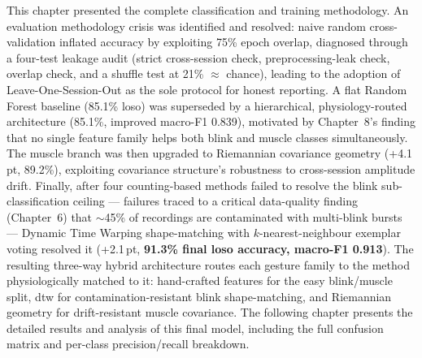 This chapter presented the complete classification and training
methodology. An evaluation methodology crisis was identified and
resolved: naive random cross-validation inflated accuracy by
exploiting 75\% epoch overlap, diagnosed through a four-test
leakage audit (strict cross-session check, preprocessing-leak
check, overlap check, and a shuffle test at 21\% $\approx$ chance),
leading to the adoption of Leave-One-Session-Out as the sole
protocol for honest reporting. A flat Random Forest baseline
(85.1\% \acrshort{loso}) was superseded by a hierarchical,
physiology-routed architecture (85.1\%, improved macro-F1 0.839),
motivated by Chapter~8's finding that no single feature family
helps both blink and muscle classes simultaneously. The muscle
branch was then upgraded to Riemannian covariance geometry
(+4.1\,pt, 89.2\%), exploiting covariance structure's robustness
to cross-session amplitude drift. Finally, after four
counting-based methods failed to resolve the blink sub-classification
ceiling --- failures traced to a critical data-quality finding
(Chapter~6) that $\sim$45\% of  recordings are
contaminated with multi-blink bursts --- Dynamic Time Warping
shape-matching with $k$-nearest-neighbour exemplar voting resolved
it (+2.1\,pt, \textbf{91.3\% final \acrshort{loso} accuracy,
macro-F1 0.913}). The resulting three-way hybrid architecture
routes each gesture family to the method physiologically matched to
it: hand-crafted features for the easy blink/muscle split,
\acrshort{dtw} for contamination-resistant blink shape-matching,
and Riemannian geometry for drift-resistant muscle covariance. The
following chapter presents the detailed results and analysis of
this final model, including the full confusion matrix and
per-class precision/recall breakdown.